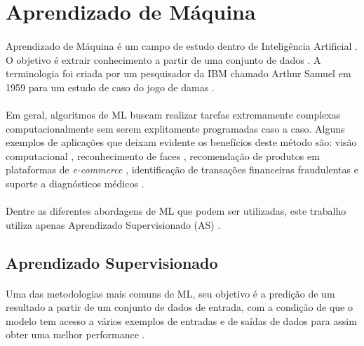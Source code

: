 \FloatBarrier
\section{Aprendizado de Máquina}

\paragraph{} Aprendizado de Máquina é um campo de estudo dentro de Inteligência Artificial \cite{ibm_ai}. O objetivo é extrair conhecimento a partir de uma conjunto de dados \cite{muller2016introduction}. A terminologia foi criada por um pesquisador da IBM chamado Arthur Samuel em 1959 \cite{ibm_ml} para um estudo de caso do jogo de damas \cite{arthur1959some}.

\paragraph{} Em geral, algoritmos de ML buscam realizar tarefas extremamente complexas computacionalmente sem serem explitamente programadas caso a caso. Alguns exemplos de aplicações que deixam evidente os benefícios deste método são: visão computacional \cite{khan2020machine}, reconhecimento de faces \cite{tripathi2017complex}, recomendação de produtos em plataformas de \textit{e-commerce} \cite{zhou2020product}, identificação de transações financeiras fraudulentas \cite{kumar2019credit} e suporte a diagnósticos médicos \cite{richens2020improving}.

\paragraph{} Dentre as diferentes abordagens de ML que podem ser utilizadas, este trabalho utiliza apenas Aprendizado Supervisionado (AS) \cite{muller2016introduction}.



\FloatBarrier
\subsection{Aprendizado Supervisionado}

\paragraph{} Uma das metodologias mais comuns de ML, seu objetivo é a predição de um resultado a partir de um conjunto de dados de entrada, com a condição de que o modelo tem acesso a vários exemplos de entradas e de saídas de dados para assim obter uma melhor performance \cite{muller2016introduction}.

